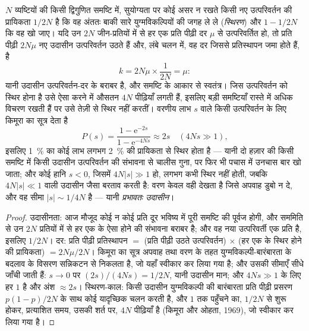 \begin{theorem}[उदासीन प्रतिस्थापन दर]\label{thm:b3:molecular-evolution:neutral}
$N$ व्यष्टियों की किसी द्विगुणित समष्टि में, सुयोग्यता पर कोई असर न रखते
किसी नए उत्परिवर्तन की प्रायिकता $1/2N$ है कि वह अंततः बाकी सारे
युग्मविकल्पियों की जगह ले ले (\emph{स्थिरण}) और $1 - 1/2N$ कि वह खो
जाए। यदि उन $2N$ जीन-प्रतियों में से हर एक प्रति पीढ़ी दर $\mu$ से
उत्परिवर्तित हो, तो प्रति पीढ़ी $2N\mu$ नए उदासीन उत्परिवर्तन उठते हैं
और, लंबे चलन में, वह दर जिससे प्रतिस्थापन जमा होते हैं, है
\[
k = 2N\mu\times\frac{1}{2N} = \mu :
\]
यानी उदासीन \emph{} उत्परिवर्तन-दर के बराबर है, और
समष्टि के आकार से स्वतंत्र। जिस उत्परिवर्तन को स्थिर होना है उसे ऐसा
करने में औसतन $4N$ पीढ़ियाँ लगती हैं, इसलिए बड़ी समष्टियाँ रास्ते में
अधिक विचरण रखती हैं पर उसे तेज़ी से स्थिर नहीं करतीं। वरणीय लाभ $s$
वाले किसी उत्परिवर्तन के लिए किमूरा का सूत्र  देता है
\[
P(s) = \frac{1 - \mathrm{e}^{-2s}}{1 - \mathrm{e}^{-4Ns}} \approx 2s
\quad (4Ns \gg 1),
\]
इसलिए \qty{1}{\%} का कोई लाभ लगभग \qty{2}{\%} की प्रायिकता से स्थिर
होता है --- यानी दो हज़ार की किसी समष्टि में किसी उदासीन उत्परिवर्तन की
संभावना से चालीस गुना, पर फिर भी पचास में उनचास बार खो जाता; और कोई
हानि $s < 0$, जिसमें $4N|s| \gg 1$ हो, लगभग कभी स्थिर नहीं होती, जबकि
$4N|s| \ll 1$ वाली उदासीन जैसा बरताव करती है: वरण केवल वही देखता है
जिसे अपवाह डुबो न दे, और वह सीमा $|s| \sim
1/4N$ है --- यानी \emph{प्रभावतः उदासीन}।
\end{theorem}
\begin{proof}
उदासीनता: आज मौजूद कोई न कोई प्रति दूर भविष्य में पूरी समष्टि की पूर्वज
होगी, और सममिति से उन $2N$ प्रतियों में से हर एक के ऐसा होने की
संभावना बराबर है; और वह नया उत्परिवर्ती एक प्रति है, इसलिए
$1/2N$। दर: प्रति पीढ़ी प्रतिस्थापन $=$ (प्रति पीढ़ी उठते उत्परिवर्तन)
$\times$ (हर एक के स्थिर होने की प्रायिकता) $= 2N\mu/2N$। किमूरा का
सूत्र अपवाह तथा वरण के तहत युग्मविकल्पी-बारंबारता के बदलाव के विसरण
सन्निकटन से निकलता है, जो यहाँ स्वीकार कर लिया गया है; और उसकी सीमाएँ
सीधे जाँची जाती हैं: $s \to 0$ पर $(2s)/(4Ns) = 1/2N$, यानी उदासीन
मान; और $4Ns \gg 1$ के लिए हर $1$ है और अंश
$\approx 2s$। स्थिरण-काल: किसी उदासीन युग्मविकल्पी की बारंबारता प्रति
पीढ़ी प्रसरण $p(1-p)/2N$ के साथ कोई यादृच्छिक चलन करती है, और $1$ तक
पहुँचने का, $1/2N$ से शुरू होकर, प्रत्याशित समय, उसकी शर्त पर, $4N$ पीढ़ियाँ है
(किमूरा और ओहता, 1969), जो स्वीकार कर लिया गया है।
\end{proof}


